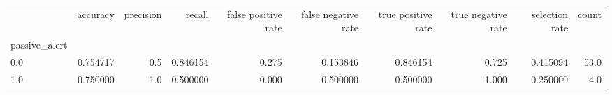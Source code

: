 \begin{tabular}{lrrrrrrrrr}
\toprule
{} &  accuracy &  precision &    recall &  false positive rate &  false negative rate &  true positive rate &  true negative rate &  selection rate &  count \\
passive\_alert &           &            &           &                      &                      &                     &                     &                 &        \\
\midrule
0.0           &  0.754717 &        0.5 &  0.846154 &                0.275 &             0.153846 &            0.846154 &               0.725 &        0.415094 &   53.0 \\
1.0           &  0.750000 &        1.0 &  0.500000 &                0.000 &             0.500000 &            0.500000 &               1.000 &        0.250000 &    4.0 \\
\bottomrule
\end{tabular}
